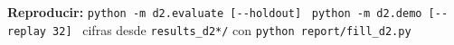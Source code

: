 \documentclass[10pt,a4paper]{extarticle}
\newcommand{\fcIdOrQ}{32}
\begin{document}
\vfill
\begin{tcolorbox}[colback=paper,colframe=navy,boxrule=0.8pt,left=2mm,right=2mm,top=0.9mm,bottom=0.9mm,arc=1mm,
  before skip=0pt,after skip=0pt]
\scriptsize \textbf{Reproducir:} \texttt{python -m d2.evaluate [-{}-holdout]} \textbullet\ \texttt{python -m d2.demo [-{}-replay \fcIdOrQ]} \textbullet\ cifras desde \texttt{results\_d2*/} con \texttt{python report/fill\_d2.py}
\end{tcolorbox}
\end{document}
